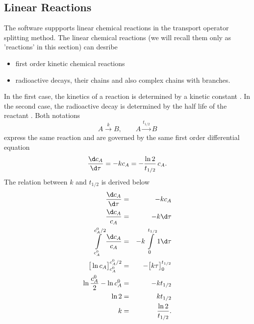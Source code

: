 %
%
%
%

\normalsize

\subsection{Linear Reactions}
\label{sec:linear_reactions}
The software suppports linear chemical reactions in the transport operator splitting method. 
The linear chemical reactions (we will recall them only as 'reactions' in this section) can desribe
\begin{itemize}
  \item first order kinetic chemical reactions
  \item radioactive decays, their chains and also complex chains with branches.
\end{itemize}
In the first case, the kinetics of a reaction is determined by a kinetic constant . 
In the second case, the radioactive decay is determined by the half life of the reactant 
. Both notations
%
\[ A\xrightarrow{k} B, \qquad A\xrightarrow{t_{1/2}} B \]
%
express the same reaction and are governed by the same first order differential equation 
%
\[ \frac{\d c_A}{\d\tau} = -kc_A = - \frac{\ln 2}{t_{1/2}}\, c_A. \]
%
The relation between $k$ and $t_{1/2}$ is derived below
\begin{eqnarray*}
    \frac{\d c_A}{\d\tau} &=& -k c_A\\
    \frac{\d c_A}{c_A} &=& -k \d\tau\\
    \int\limits_{c_A^0}^{c_A^0/2}\frac{\d c_A}{c_A} &=& -k\int\limits_{0}^{t_{1/2}} 1\d\tau\\
    \big[ \ln c_A\big]^{c_A^0/2}_{c_A^0} &=& -\big[k\tau\big]^{t_{1/2}}_{0}\\
    \ln\frac{c_A^0}{2} - \ln c_A^0 &=& - k t_{1/2}\\
    \ln 2 &=& k t_{1/2}\\
    k &=& \frac{\ln 2}{t_{1/2}}.
\end{eqnarray*}



